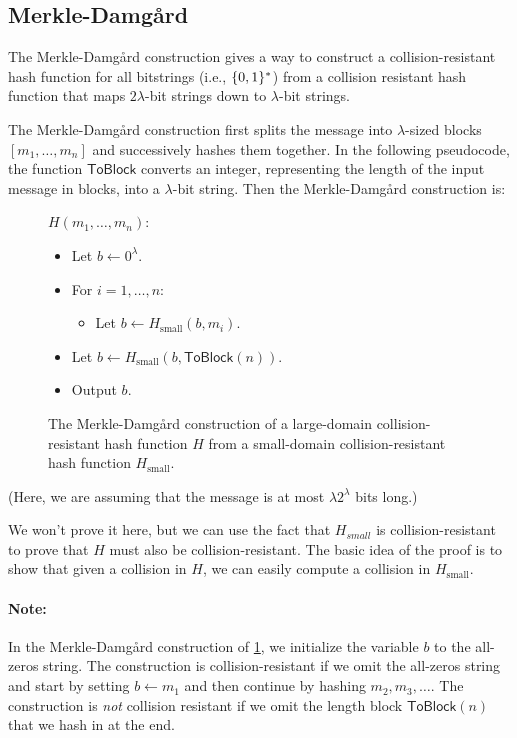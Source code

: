 \subsection{Merkle-Damg\aa{}rd}
The Merkle-Damg\aa{}rd construction gives a way to construct
a collision-resistant hash function for all bitstrings (i.e., $\{0,1\}^*$)
from a collision resistant hash function that maps $2\lambda$-bit strings
down to $\lambda$-bit strings.

The Merkle-Damg\aa{}rd construction first splits the
message into $\lambda$-sized blocks $[m_1, \ldots, m_n]$ and successively hashes them together.
In the following pseudocode,
the function $\mathsf{ToBlock}$ converts an integer, representing the length of the input message
in blocks, into a $\lambda$-bit string.
Then the Merkle-Damg\aa{}rd construction is:
\begin{figure}
\begin{framed}
\noindent
  $H(m_1, \dots, m_n)$: \qquad {}
\begin{itemize}[noitemsep]
  \item Let $b \gets 0^\lambda$.
  \item For $i = 1, \dots, n$:
   \begin{itemize}
     \item Let $b \gets H_\text{small}(b, m_i)$.
   \end{itemize}
 \item Let $b \gets H_\text{small}(b, \mathsf{ToBlock}(n))$.
 \item Output $b$.
\end{itemize}
\end{framed}
\caption{The Merkle-Damg\aa{}rd construction of a large-domain
collision-resistant hash function $H$ from a small-domain
collision-resistant hash function $H_\text{small}$.}
  \label{fig:md}
\end{figure}
(Here, we are assuming that the message is at most 
$\lambda 2^{\lambda}$ bits long.)

We won't prove it here, but we can use the fact that $H_{small}$ is collision-resistant to prove that $H$ must also be collision-resistant. The basic idea of the proof is to show that given a collision in $H$, we can easily compute a collision in $H_{\text{small}}$. 

\paragraph{Note:} In 
the Merkle-Damg\aa{}rd construction of \cref{fig:md},
we initialize the variable $b$ to the all-zeros string.
The construction is collision-resistant if we omit the all-zeros
string and start by setting $b \gets m_1$ and then continue by hashing $m_2, m_3, \dots$.
The construction is \emph{not} collision resistant if we omit the length block
$\mathsf{ToBlock}(n)$ that we hash in at the end.



